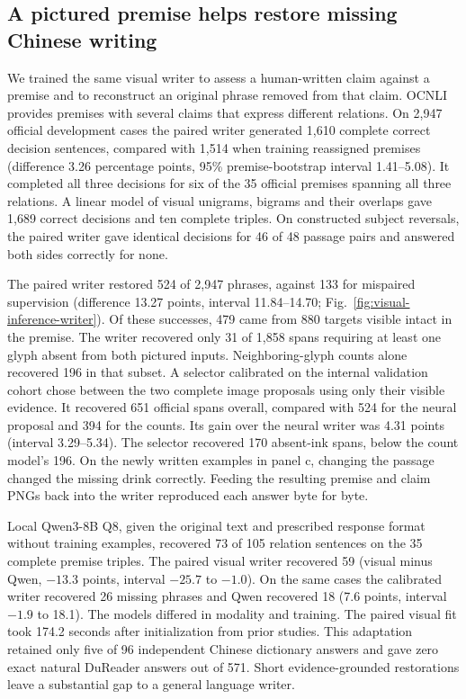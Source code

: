 \documentclass[12pt,a4paper]{article}
\providecommand{\DIFadd}[1]{{\protect\color{blue} \sf #1}} %
\begin{document}
\subsection*{\DIFadd{A pictured premise helps restore missing Chinese writing}}
\DIFadd{We trained the same visual writer to assess a human-written claim against a premise and to reconstruct an original phrase removed from that claim. OCNLI provides premises with several claims that express different relations\cite{ocnli}. On 2,947 official development cases the paired writer generated 1,610 complete correct decision sentences, compared with 1,514 when training reassigned premises (difference 3.26 percentage points, 95\% premise-bootstrap interval 1.41--5.08). It completed all three decisions for six of the 35 official premises spanning all three relations. A linear model of visual unigrams, bigrams and their overlaps gave 1,689 correct decisions and ten complete triples. On constructed subject reversals, the paired writer gave identical decisions for 46 of 48 passage pairs and answered both sides correctly for none.
}

\DIFadd{The paired writer restored 524 of 2,947 phrases, against 133 for mispaired supervision (difference 13.27 points, interval 11.84--14.70; Fig.~\ref{fig:visual-inference-writer}). Of these successes, 479 came from 880 targets visible intact in the premise. The writer recovered only 31 of 1,858 spans requiring at least one glyph absent from both pictured inputs. Neighboring-glyph counts alone recovered 196 in that subset. A selector calibrated on the internal validation cohort chose between the two complete image proposals using only their visible evidence. It recovered 651 official spans overall, compared with 524 for the neural proposal and 394 for the counts. Its gain over the neural writer was 4.31 points (interval 3.29--5.34). The selector recovered 170 absent-ink spans, below the count model's 196. On the newly written examples in panel c, changing the passage changed the missing drink correctly. Feeding the resulting premise and claim PNGs back into the writer reproduced each answer byte for byte.
}

\DIFadd{Local Qwen3-8B Q8, given the original text and prescribed response format without training examples, recovered 73 of 105 relation sentences on the 35 complete premise triples. The paired visual writer recovered 59 (visual minus Qwen, $-13.3$ points, interval $-25.7$ to $-1.0$). On the same cases the calibrated writer recovered 26 missing phrases and Qwen recovered 18 (7.6 points, interval $-1.9$ to 18.1). The models differed in modality and training. The paired visual fit took 174.2 seconds after initialization from prior studies. This adaptation retained only five of 96 independent Chinese dictionary answers and gave zero exact natural DuReader answers out of 571. Short evidence-grounded restorations leave a substantial gap to a general language writer.
}
\end{document}
